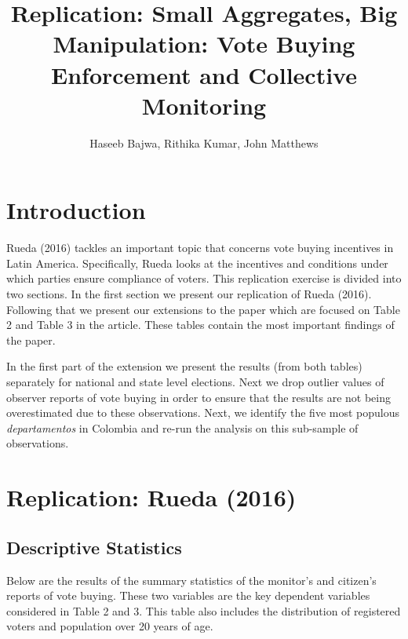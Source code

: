 \documentclass[12pt]{article}
\title{Replication: Small Aggregates, Big Manipulation: Vote Buying Enforcement and Collective Monitoring}
\author{Haseeb Bajwa, Rithika Kumar, John Matthews}
\begin{document}
\maketitle
\tableofcontents
\section{Introduction}

Rueda (2016) tackles an important topic that concerns vote buying incentives in Latin America. Specifically, Rueda looks at the incentives and conditions under which parties ensure compliance of voters. This replication exercise is divided into two sections. In the first section we present our replication of Rueda (2016). Following that we present our extensions to the paper which are focused on Table 2 and Table 3 in the article. These tables contain the most important findings of the paper. 

In the first part of the extension we present the results (from both tables) separately for national and state level elections. Next we drop outlier values of observer reports of vote buying in order to ensure that the results are not being overestimated due to these observations. Next, we identify the five most populous \textit{departamentos} in Colombia and re-run the analysis on this sub-sample of observations.

\section{Replication: Rueda (2016)}

\subsection{Descriptive Statistics}
 
Below are the results of the summary statistics of the monitor's and citizen's reports of vote buying. These two variables are the key dependent variables considered in Table 2 and 3. This table also includes the distribution of registered voters and population over 20 years of age. 
\FloatBarrier
\begin{table}[]
    \caption*{Summary Statistics}
    \centering
{}
\end{table}
\FloatBarrier
\end{document}
